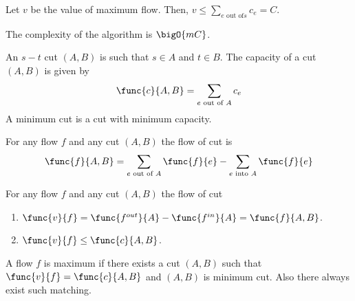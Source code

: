 \begin{proposition}
    Let \(v\) be the value of maximum flow. Then, \(v \leq \sum_{e \text{ out of} s} c_e = C\). 
\end{proposition}

\begin{proposition}
    The complexity of the algorithm is \(\bigO{mC}\).
\end{proposition}

\begin{definition}
    An \(s-t\) cut \((A,B)\) is such that \(s \in A\) and \(t \in B\). The capacity of a cut \((A,B)\) is given by 
    \begin{equation*}
        \func{c}{A,B} = \sum_{e \text{ out of } A} c_e
    \end{equation*}
    A minimum cut is a cut with minimum capacity.
\end{definition}
\begin{definition}
    For any flow \(f\) and any cut \((A,B)\) the flow of cut is 
    \begin{equation*}
        \func{f}{A,B}  = \sum_{e \text{ out of } A} \func{f}{e} - \sum_{e \text{ into } A} \func{f}{e}
    \end{equation*}
\end{definition}

\begin{proposition}
    For any flow \(f\) and any cut \((A,B)\) the flow of cut 
    \begin{enumerate}
        \item \(\func{v}{f} = \func{f^{out}}{A} - \func{f^{in}}{A} = \func{f}{A,B}\).
        \item \(\func{v}{f} \leq \func{c}{A,B}\).
    \end{enumerate}
\end{proposition}

\begin{lemma}
    A flow \(f\) is maximum if there exists a cut \((A,B)\) such that \(\func{v}{f} = \func{c}{A,B}\) and \((A,B)\) is minimum cut. Also there always exist such matching.
\end{lemma}

